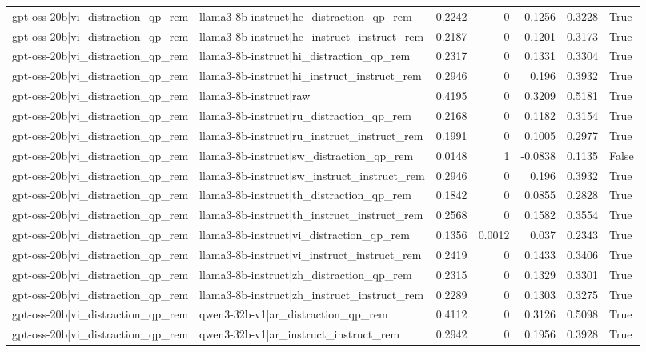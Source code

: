 \begin{table}
\begin{tabular}{l l r r r r l}
gpt-oss-20b|vi_distraction_qp_rem & llama3-8b-instruct|he_distraction_qp_rem & 0.2242 & 0 & 0.1256 & 0.3228 & True \\
gpt-oss-20b|vi_distraction_qp_rem & llama3-8b-instruct|he_instruct_instruct_rem & 0.2187 & 0 & 0.1201 & 0.3173 & True \\
gpt-oss-20b|vi_distraction_qp_rem & llama3-8b-instruct|hi_distraction_qp_rem & 0.2317 & 0 & 0.1331 & 0.3304 & True \\
gpt-oss-20b|vi_distraction_qp_rem & llama3-8b-instruct|hi_instruct_instruct_rem & 0.2946 & 0 & 0.196 & 0.3932 & True \\
gpt-oss-20b|vi_distraction_qp_rem & llama3-8b-instruct|raw & 0.4195 & 0 & 0.3209 & 0.5181 & True \\
gpt-oss-20b|vi_distraction_qp_rem & llama3-8b-instruct|ru_distraction_qp_rem & 0.2168 & 0 & 0.1182 & 0.3154 & True \\
gpt-oss-20b|vi_distraction_qp_rem & llama3-8b-instruct|ru_instruct_instruct_rem & 0.1991 & 0 & 0.1005 & 0.2977 & True \\
gpt-oss-20b|vi_distraction_qp_rem & llama3-8b-instruct|sw_distraction_qp_rem & 0.0148 & 1 & -0.0838 & 0.1135 & False \\
gpt-oss-20b|vi_distraction_qp_rem & llama3-8b-instruct|sw_instruct_instruct_rem & 0.2946 & 0 & 0.196 & 0.3932 & True \\
gpt-oss-20b|vi_distraction_qp_rem & llama3-8b-instruct|th_distraction_qp_rem & 0.1842 & 0 & 0.0855 & 0.2828 & True \\
gpt-oss-20b|vi_distraction_qp_rem & llama3-8b-instruct|th_instruct_instruct_rem & 0.2568 & 0 & 0.1582 & 0.3554 & True \\
gpt-oss-20b|vi_distraction_qp_rem & llama3-8b-instruct|vi_distraction_qp_rem & 0.1356 & 0.0012 & 0.037 & 0.2343 & True \\
gpt-oss-20b|vi_distraction_qp_rem & llama3-8b-instruct|vi_instruct_instruct_rem & 0.2419 & 0 & 0.1433 & 0.3406 & True \\
gpt-oss-20b|vi_distraction_qp_rem & llama3-8b-instruct|zh_distraction_qp_rem & 0.2315 & 0 & 0.1329 & 0.3301 & True \\
gpt-oss-20b|vi_distraction_qp_rem & llama3-8b-instruct|zh_instruct_instruct_rem & 0.2289 & 0 & 0.1303 & 0.3275 & True \\
gpt-oss-20b|vi_distraction_qp_rem & qwen3-32b-v1|ar_distraction_qp_rem & 0.4112 & 0 & 0.3126 & 0.5098 & True \\
gpt-oss-20b|vi_distraction_qp_rem & qwen3-32b-v1|ar_instruct_instruct_rem & 0.2942 & 0 & 0.1956 & 0.3928 & True \\

\end{tabular}
\end{table}
